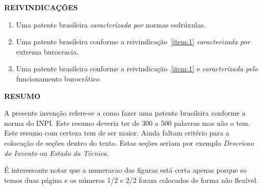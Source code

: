 \documentclass[12pt]{article}
\begin{document}
\linenumbers
\renewcommand\linenumberfont{\normalfont\small}
\setlength{\linenumbersep}{1cm}


 \chead{\rm\hfil\thepage\ / \pageref{fimreivind}\hfil}



\Large
\begin{center}
  \textbf{REIVINDICAÇÕES}
\end{center}

\normalsize


\begin{enumerate}
\item \label{item:1} Uma patente brasileira  \emph{caracterizada por}
  normas esdrúxulas.

\item \label{item:2} Uma patente brasileira  conforme a
  reivindicação~\ref{item:1} \emph{caracterizada por} extrema burocracia.
  
\item \label{item:3} Uma patente brasileira conforme a
  reivindicação~\ref{item:1} e \emph{caracterizada pelo} funcionamento
  burocrático

\end{enumerate}


\label{fimreivind}


\newpage


\Large
\begin{center}
\textbf{RESUMO}  
\end{center}
\normalsize
\thispagestyle{empty}


A presente invenção refere-se a como fazer uma patente brasileira
conforme a norma do INPI. Este resumo deveria ter de 300 a 500
palavras mas não o tem. Este resumo com certeza tem de ser maior.
Ainda faltam critério para a colocação de seções dentro do texto.
Estas seções seriam por exemplo \emph{Descricao do Invento} ou
\emph{Estado da Técnica}. 

É interessante notar que a numeracao das figuras está certa apenas
porque so temos duas página e os números 1/2 e 2/2 foram colocados de
forma não flexível.
\end{document}
